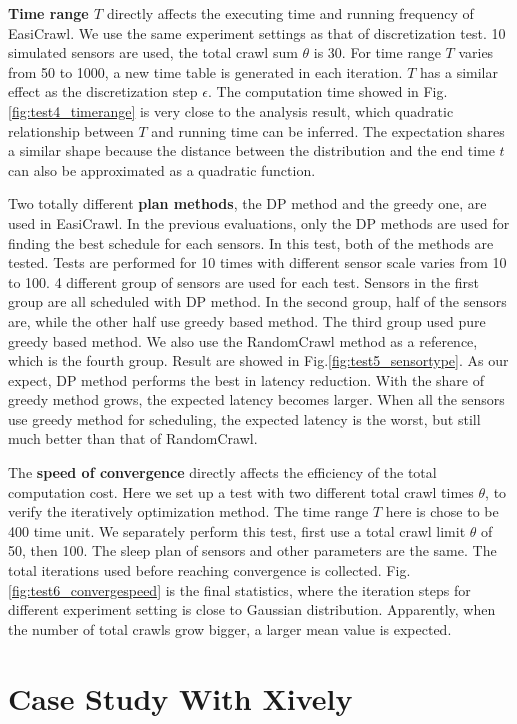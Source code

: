 \documentclass[conference]{IEEEtran}
\begin{document}
\textbf{Time range $T$} directly affects the executing time and running frequency of EasiCrawl.
We use the same experiment settings as that of discretization test. 
10 simulated sensors are used, the total crawl sum $\theta$ is 30. 
For time range $T$ varies from 50 to 1000, a new time table is generated in each iteration.
$T$ has a similar effect as the discretization step $\epsilon$. 
The computation time showed in Fig.\ref{fig:test4_timerange} is very close to the analysis result, which quadratic relationship between $T$ and running time can be inferred. 
The expectation shares a similar shape because the distance between the distribution and the end time $t$ can also be approximated as a quadratic function.

Two totally different \textbf{plan methods}, the DP method and the greedy one, are used in EasiCrawl.
In the previous evaluations, only the DP methods are used for finding the best schedule for each sensors. 
In this test, both of the methods are tested. 
Tests are performed for 10 times with different sensor scale varies from 10 to 100. 
4 different group of sensors are used for each test. 
Sensors in the first group are all scheduled with DP method.
In the second group, half of the sensors are, while the other half use greedy based method. 
The third group used pure greedy based method. We also use the RandomCrawl method as a reference, which is the fourth group.
Result are showed in Fig.\ref{fig:test5_sensortype}. 
As our expect, DP method performs the best in latency reduction. 
With the share of greedy method grows, the expected latency becomes larger. 
When all the sensors use greedy method for scheduling, the expected latency is the worst, but still much better than that of RandomCrawl.

The \textbf{speed of convergence} directly affects the efficiency of the total computation cost. 
Here we set up a test with two different total crawl times $\theta$, to verify the iteratively optimization method. 
The time range $T$ here is chose to be 400 time unit. 
We separately perform this test, first use a total crawl limit $\theta$ of 50, then 100. 
The sleep plan of sensors and other parameters are the same. 
The total iterations used before reaching convergence is collected.
Fig.\ref{fig:test6_convergespeed} is the final statistics, where the iteration steps for different experiment setting is close to Gaussian distribution. 
Apparently, when the number of total crawls grow bigger, a larger mean value is expected.

\section{Case Study With Xively} \label{case_study}
\end{document}
